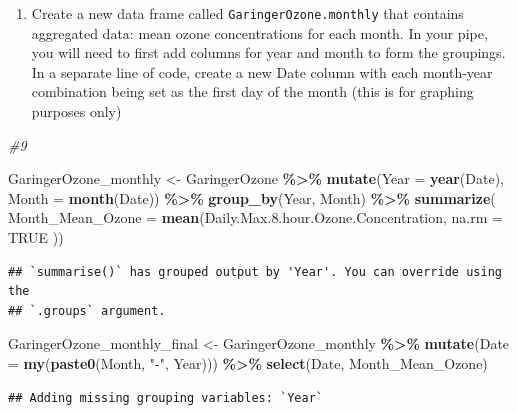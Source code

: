 \documentclass[
]{article}
\newenvironment{Shaded}{\begin{snugshade}}{\end{snugshade}}
\newcommand{\AttributeTok}[1]{\textcolor[rgb]{0.13,0.29,0.53}{#1}}
\newcommand{\CommentTok}[1]{\textcolor[rgb]{0.56,0.35,0.01}{\textit{#1}}}
\newcommand{\ConstantTok}[1]{\textcolor[rgb]{0.56,0.35,0.01}{#1}}
\newcommand{\FloatTok}[1]{\textcolor[rgb]{0.00,0.00,0.81}{#1}}
\newcommand{\FunctionTok}[1]{\textcolor[rgb]{0.13,0.29,0.53}{\textbf{#1}}}
\newcommand{\NormalTok}[1]{#1}
\newcommand{\OtherTok}[1]{\textcolor[rgb]{0.56,0.35,0.01}{#1}}
\newcommand{\SpecialCharTok}[1]{\textcolor[rgb]{0.81,0.36,0.00}{\textbf{#1}}}
\newcommand{\StringTok}[1]{\textcolor[rgb]{0.31,0.60,0.02}{#1}}
\providecommand{\tightlist}{%
  \setlength{\itemsep}{0pt}\setlength{\parskip}{0pt}}
\begin{document}
\begin{enumerate}
\def\labelenumi{\arabic{enumi}.}
\setcounter{enumi}{8}
\tightlist
\item
  Create a new data frame called \texttt{GaringerOzone.monthly} that
  contains aggregated data: mean ozone concentrations for each month. In
  your pipe, you will need to first add columns for year and month to
  form the groupings. In a separate line of code, create a new Date
  column with each month-year combination being set as the first day of
  the month (this is for graphing purposes only)
\end{enumerate}

\begin{Shaded}
\begin{Highlighting}[]
\CommentTok{\#9}

\NormalTok{GaringerOzone\_monthly }\OtherTok{\textless{}{-}}
\NormalTok{  GaringerOzone }\SpecialCharTok{\%\textgreater{}\%} 
   \FunctionTok{mutate}\NormalTok{(}\AttributeTok{Year =} \FunctionTok{year}\NormalTok{(Date),}
        \AttributeTok{Month =} \FunctionTok{month}\NormalTok{(Date)) }\SpecialCharTok{\%\textgreater{}\%}
    \FunctionTok{group\_by}\NormalTok{(Year, Month) }\SpecialCharTok{\%\textgreater{}\%}
    \FunctionTok{summarize}\NormalTok{( }
    \AttributeTok{Month\_Mean\_Ozone =}  \FunctionTok{mean}\NormalTok{(Daily.Max.}\FloatTok{8.}\NormalTok{hour.Ozone.Concentration, }\AttributeTok{na.rm =} \ConstantTok{TRUE}
\NormalTok{    ))}
\end{Highlighting}
\end{Shaded}

\begin{verbatim}
## `summarise()` has grouped output by 'Year'. You can override using the
## `.groups` argument.
\end{verbatim}

\begin{Shaded}
\begin{Highlighting}[]
\NormalTok{GaringerOzone\_monthly\_final }\OtherTok{\textless{}{-}}  
\NormalTok{  GaringerOzone\_monthly }\SpecialCharTok{\%\textgreater{}\%} 
    \FunctionTok{mutate}\NormalTok{(}\AttributeTok{Date =} \FunctionTok{my}\NormalTok{(}\FunctionTok{paste0}\NormalTok{(Month, }\StringTok{"{-}"}\NormalTok{, Year))) }\SpecialCharTok{\%\textgreater{}\%}
    \FunctionTok{select}\NormalTok{(Date, Month\_Mean\_Ozone)}
\end{Highlighting}
\end{Shaded}

\begin{verbatim}
## Adding missing grouping variables: `Year`
\end{verbatim}
\end{document}
